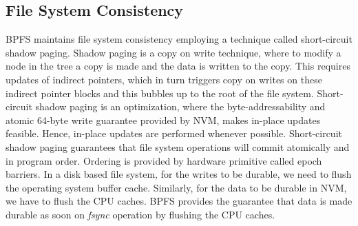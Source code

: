 \subsection{File System Consistency}
BPFS maintains file system consistency employing a technique called short-circuit shadow paging. Shadow paging is a copy on write technique, where to modify a node in the tree a copy is made and the data is written to the copy. This requires updates of indirect pointers, which in turn triggers copy on writes on these indirect pointer blocks and this bubbles up to the root of the file system. Short-circuit shadow paging is an optimization, where the byte-addressability and atomic 64-byte write guarantee provided by NVM, makes in-place updates feasible. Hence, in-place updates are performed whenever possible. Short-circuit shadow paging guarantees that file system operations will commit atomically and in program order. Ordering is provided by hardware primitive called epoch barriers. In a disk based file system, for the writes to be durable, we need to flush the operating system buffer cache. Similarly, for the data to be durable in NVM, we have to flush the CPU caches. BPFS provides the guarantee that data is made durable as soon on \textit{fsync} operation by flushing the CPU caches.
